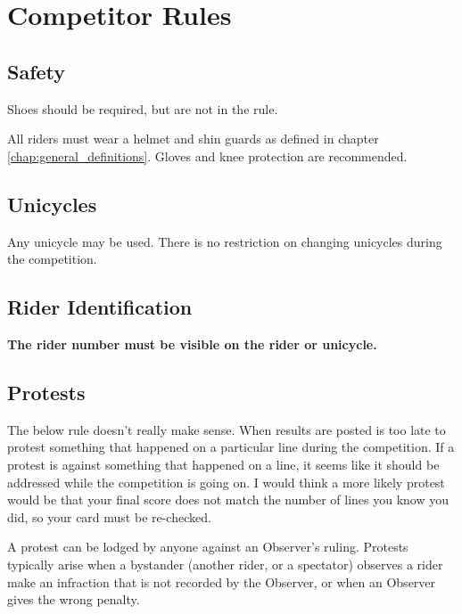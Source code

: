 \chapter{Competitor Rules}

\section{Safety}

\begin{framed}
Shoes should be required, but are not in the rule.
\end{framed}

All riders must wear a helmet and shin guards as defined in chapter \ref{chap:general_definitions}.
Gloves and knee protection are recommended.

\section{Unicycles}

Any unicycle may be used. 
There is no restriction on changing unicycles during the competition.

\section{Rider Identification}

\textbf{The rider number must be visible on the rider or unicycle.}

\section{Protests}

\begin{framed}
The below rule doesn't really make sense.  When results are posted is too late to protest something that happened on a particular line during the competition.  If a protest is against something that happened on a line, it seems like it should be addressed while the competition is going on.  I would think a more likely protest would be that your final score does not match the number of lines you know you did, so your card must be re-checked.
\end{framed}

A protest can be lodged by anyone against an Observer's ruling. 
Protests typically arise when a bystander (another rider, or a spectator) observes a rider make an infraction that is not recorded by the Observer, or when an Observer gives the wrong penalty.

